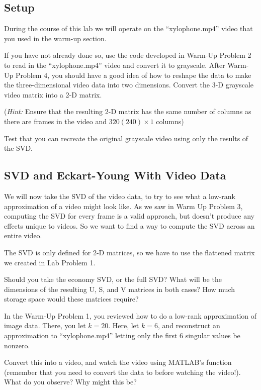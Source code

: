 \subsection{Setup}

During the course of this lab we will operate on the ``xylophone.mp4'' video that you used in the warm-up section.

If you have not already done so, use the code developed in Warm-Up Problem 2 to read in the ``xylophone.mp4'' video and convert it to grayscale. After Warm-Up Problem 4, you should have a good idea of how to reshape the data to make the three-dimensional video data into two dimensions. Convert the 3-D grayscale video matrix into a 2-D matrix.

(\textit{Hint:} Ensure that the resulting 2-D matrix has the same number of columns as there are frames in the video and $320(240) \times 1$ columns)

Test that you can recreate the original grayscale video using only the results of the SVD.

\subsection{SVD and Eckart-Young With Video Data}

We will now take the SVD of the video data, to try to see what a low-rank approximation of a video might look like. As we saw in Warm Up Problem 3, computing the SVD for every frame is a valid approach, but doesn't produce any effects unique to videos. So we want to find a way to compute the SVD across an entire video.

The SVD is only defined for 2-D matrices, so we have to use the flattened matrix we created in Lab Problem 1.

Should you take the economy SVD, or the full SVD? What will be the dimensions of the resulting U, S, and V matrices in both cases? How much storage space would these matrices require?

In the Warm-Up Problem 1, you reviewed how to do a low-rank approximation of image data. There, you let $k = 20$. Here, let $k = 6$, and reconstruct an approximation to ``xylophone.mp4'' letting only the first 6 singular values be nonzero.

Convert this into a video, and watch the video using MATLAB's  function (remember that you need to convert the data to  before watching the video!). What do you observe? Why might this be?

